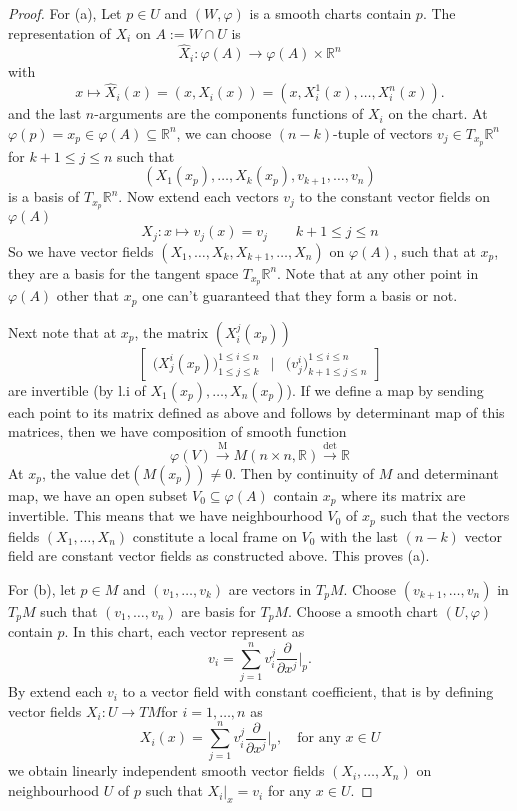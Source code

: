 \documentclass[a4paper]{article}
\theoremstyle{remark}
\newcommand{\doo}{\partial}    %
\begin{document}
\begin{proof}
For (a), Let $p \in U$ and $(W,\varphi)$ is a smooth charts contain $p$. The representation of $X_i$ on $A := W\cap U$ is 
$$
\widehat{X}_i : \varphi(A) \rightarrow \varphi(A) \times \mathbb{R}^n
$$
with
$$
x \mapsto \widehat{X}_i(x) =(x,X_i(x))= (x,X_i^1(x), \dots, X_i^n(x)).
$$
and the last $n$-arguments are the components functions of $X_i$ on the chart. At $\varphi(p) = x_p \in \varphi(A) \subseteq \mathbb{R}^n$, we can choose $(n-k)$-tuple of vectors $v_j \in T_{x_p}\mathbb{R}^n$  for $k+1 \leq j \leq n$ such that  $$(X_1(x_p),\dots,X_k(x_p),v_{k+1},\dots,v_n)$$ is a basis of $T_{x_p}\mathbb{R}^n$. Now extend each vectors $v_j$ to the constant vector fields on $\varphi(A)$
$$
X_j : x \mapsto v_j(x) = v_j \qquad k+1 \leq j \leq n
$$
So we have vector fields $(X_1,\dots,X_k,X_{k+1},\dots, X_{n})$ on $\varphi(A)$,  such that at $x_p$, they are a basis for the tangent space $T_{x_p}\mathbb{R}^n$. Note that at any other point in $\varphi(A)$ other that $x_p$ one can't guaranteed that they form a basis or not. 

Next note that at $x_p$, the matrix $(X_i^j(x_p))$
$$
\begin{bmatrix}
    \Big( X^i_j(x_p) \Big)^{1\leq i \leq n}_{1 \leq j \leq k} &  \Bigg| & \Big( v^i_j \Big)^{1\leq i \leq n}_{k+1 \leq j \leq n} 
\end{bmatrix}
$$
are invertible (by l.i of $X_1(x_p),\dots,X_n(x_p)$). If we define a map by sending each point to its matrix defined as above and follows by determinant map of this matrices, then we have composition of smooth function
$$
\varphi(V) \xrightarrow{\text{M}} M(n \times n, \mathbb{R}) \xrightarrow{\text{det}}  \mathbb{R}
$$
At $x_p$, the value $\text{det}(M(x_p)) \neq 0$. Then by continuity of $M$ and determinant map, we have an open subset $V_0 \subseteq \varphi(A)$ contain $x_p$ where its matrix are invertible. This means that we have neighbourhood $V_0$ of $x_p$ such that the vectors fields $(X_1,\dots,X_n)$ constitute a local frame on $V_0$ with the last $(n-k)$ vector field are constant vector fields as constructed above. This proves (a).

For (b), let $p \in M$ and $(v_1,\dots,v_k)$ are vectors in $T_pM$. Choose $(v_{k+1},\dots,v_n)$ in $T_pM$ such that $(v_1,\dots,v_n)$ are basis for $T_pM$. Choose a smooth chart $(U,\varphi)$ contain $p$. In this chart, each vector represent as
$$
v_i = \sum_{j=1}^{n} v^j_i \frac{\doo }{\doo x^j}\bigg|_p.
$$
By extend each $v_i$ to a vector field with constant coefficient, that is by defining vector fields $X_i : U \to TM$for $i=1,\dots,n$ as
$$
X_i(x) = \sum_{j=1}^{n} v_i^j \frac{\doo}{\doo x^j}\bigg|_p, \quad \text{for any }x \in U
$$
we obtain linearly independent smooth vector fields $(X_i,\dots,X_n)$ on neighbourhood $U$ of $p$ such that $X_i|_x = v_i$ for any $x \in U$. 


\end{proof}
\end{document}
